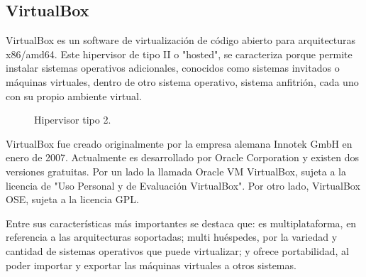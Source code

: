 \subsection{VirtualBox}

VirtualBox es un software de virtualización de código abierto para arquitecturas x86/amd64. Este hipervisor de tipo II o "hosted", se caracteriza porque permite instalar sistemas operativos adicionales, conocidos como sistemas invitados o máquinas virtuales, dentro de otro sistema operativo, sistema anfitrión, cada uno con su propio ambiente virtual.

\begin{figure}[H]
\caption{Hipervisor tipo 2.\label{fig:figure_placement_example}}
\end{figure}

VirtualBox fue creado originalmente por la empresa alemana Innotek GmbH en enero de 2007. Actualmente es desarrollado por Oracle Corporation y existen dos versiones gratuitas. Por un lado la llamada Oracle VM VirtualBox, sujeta a la licencia de "Uso Personal y de Evaluación VirtualBox". Por otro lado, VirtualBox OSE, sujeta a la licencia GPL.

Entre sus características más importantes se destaca que: es multiplataforma, en referencia a las arquitecturas soportadas; multi huéspedes, por la variedad y cantidad de sistemas operativos que puede virtualizar; y ofrece portabilidad, al poder importar y exportar las máquinas virtuales a otros sistemas.

